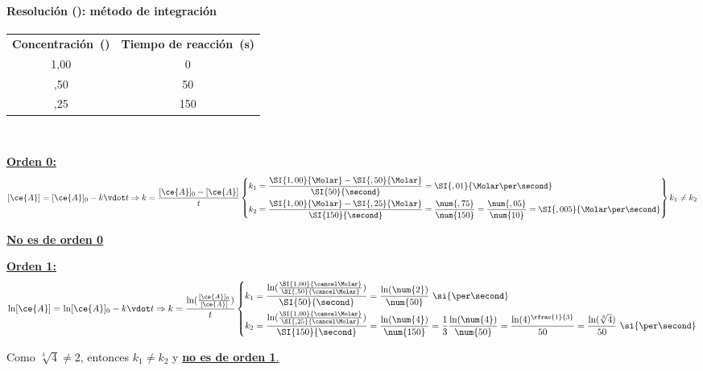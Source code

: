 \begin{frame}
	\frametitle{\ejerciciocmd}
	\framesubtitle{Resolución (): método de integración}
	\begin{center}
		\begin{tabular}{SS}
			{\textbf{Concentración~(\si{\Molar})}}			&
			{\textbf{Tiempo de reacción~(\si{\second})}}	\\
			1,00							&	  0			\\
			 ,50							&	 50			\\
			 ,25							&	150			\\
		\end{tabular}
	\end{center}
	\\[.2cm]
	\begin{overprint}
			\underline{\textbf{\color{red!50!black}Orden 0:}}
			$$
				[\ce{A}] = [\ce{A}]_0 - k\vdot t\Rightarrow
				k = \frac{[\ce{A}]_0 - [\ce{A}]}{t}\left\{
				\begin{aligned}
					k_1 = \frac{\SI{1,00}{\Molar} - \SI{,50}{\Molar}}{ \SI{50}{\second}} &= \SI{,01}{\Molar\per\second}	\\
					k_2 = \frac{\SI{1,00}{\Molar} - \SI{,25}{\Molar}}{\SI{150}{\second}} &= \frac{\num{,75}}{\num{150}}=\frac{\num{,05}}{\num{10}} = \SI{,005}{\Molar\per\second}
				\end{aligned}
				\right\} k_1\neq k_2
			$$
			\begin{center}
				\underline{\textbf{No es de orden 0}}
			\end{center}
			\underline{\textbf{\color{red!50!black}Orden 1:}}
			$$
				\ln[\ce{A}] = \ln[\ce{A}]_0 - k\vdot t\Rightarrow
				k = \frac{\ln(\frac{[\ce{A}]_0}{[\ce{A}]})}{t}\left\{
				\begin{aligned}
					k_1 = \frac{\ln(\frac{\SI{1,00}{\cancel\Molar}}{\SI{,50}{\cancel\Molar}})}{ \SI{50}{\second}} &= \frac{\ln(\num{2})}{\num{50}}~\si{\per\second}\\
					k_2 = \frac{\ln(\frac{\SI{1,00}{\cancel\Molar}}{\SI{,25}{\cancel\Molar}})}{\SI{150}{\second}} &= \frac{\ln(\num{4})}{\num{150}} = \frac{1}{3}\frac{\ln(\num{4})}{\num{50}} =
					      \frac{\ln(4)^{\rfrac{1}{3}}}{50}=\frac{\ln(\sqrt[3]{4})}{50}~\si{\per\second}
				\end{aligned}
				\right.
			$$
			\begin{center}
				Como $\sqrt[3]{4}\neq 2$, entonces $k_1\neq k_2$ y \underline{\textbf{no es de orden 1}.}

\end{center}
\end{overprint}
\end{frame}

